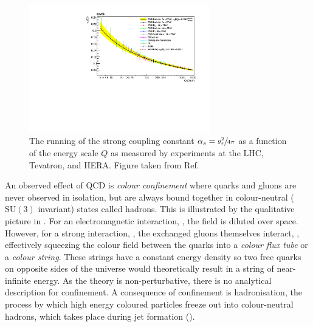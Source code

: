 \begin{figure}[h]
    \centering
    \includegraphics[width=0.7\textwidth]{Figures/standard_model/running}
    \caption{The running of the strong coupling constant $\alpha_s = \sfrac{g_s^2}{4\pi}$ as a function of the energy scale $Q$ as measured by experiments at the LHC, Tevatron, and HERA. Figure taken from Ref.~\cite{CMSRunning}}
    \label{fig:asymptotic_freedom}
\end{figure}

An observed effect of QCD is \textit{colour confinement} where quarks and gluons are never observed in isolation, but are always bound together in colour-neutral ($\text{SU}(3)$ invariant) states called hadrons.
This is illustrated by the qualitative picture in .
For an electromagnetic interaction, , the field is diluted over space.
However, for a strong interaction, , the exchanged gluons themselves interact, , effectively squeezing the colour field between the quarks into a \textit{colour flux tube} or a \textit{colour string}.
These strings have a constant energy density so two free quarks on opposite sides of the universe would theoretically result in a string of near-infinite energy.
As the theory is non-perturbative, there is no analytical description for confinement.
A consequence of confinement is hadronisation, the process by which high energy coloured particles freeze out into colour-neutral hadrons, which takes place during jet formation ().

